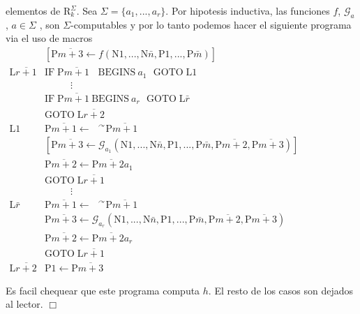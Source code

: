 elementos de \(\mathrm{R}_{k}^{\Sigma }\). Sea \(\Sigma =\{a_{1},...,a_{r}\}.\) Por hipotesis inductiva, las funciones \(f\), \(\mathcal{G}_{a}\), \(a\in \Sigma \) , son \(\Sigma \)-computables y por lo tanto podemos hacer el siguiente programa via el uso de macros
\(\displaystyle \begin{array}{rl} & \left[ \mathrm{P}\overline{m+3}\leftarrow f(\mathrm{N}1,...,\mathrm{N}\bar{ n},\mathrm{P}1,...,\mathrm{P}\bar{m})\right] \\ \mathrm{L}\overline{r+1} & \mathrm{IF}\;\mathrm{P}\overline{m+1}\ \text{ {B}}\mathrm{EGINS\ }a_{1}\text{ }\mathrm{GOTO}\;\mathrm{L}1 \\ & \ \ \ \ \ \ \ \ \ \ \ \ \vdots \\ & \mathrm{IF}\;\mathrm{P}\overline{m+1}\ \mathrm{BEGINS\ }a_{r}\text{ } \mathrm{GOTO}\;\mathrm{L}\bar{r} \\ & \mathrm{GOTO}\;\mathrm{L}\overline{r+2} \\ \mathrm{L}1 & \mathrm{P}\overline{m+1}\leftarrow \text{ }^{\curvearrowright } \mathrm{P}\overline{m+1} \\ & \left[ \mathrm{P}\overline{m+3}\leftarrow \mathcal{G}_{a_{1}}(\mathrm{N} 1,...,\mathrm{N}\bar{n},\mathrm{P}1,...,\mathrm{P}\bar{m},\mathrm{P} \overline{m+2},\mathrm{P}\overline{m+3})\right] \\ & \mathrm{P}\overline{m+2}\leftarrow \mathrm{P}\overline{m+2}a_{1} \\ & \mathrm{GOTO}\;\mathrm{L}\overline{r+1} \\ & \ \ \ \ \ \ \ \ \ \ \ \ \vdots \\ \mathrm{L}\bar{r} & \mathrm{P}\overline{m+1}\leftarrow \text{ } ^{\curvearrowright }\mathrm{P}\overline{m+1} \\ & \mathrm{P}\overline{m+3}\leftarrow \mathcal{G}_{a_{r}}(\mathrm{N}1,..., \mathrm{N}\bar{n},\mathrm{P}1,...,\mathrm{P}\bar{m},\mathrm{P}\overline{m+2}, \mathrm{P}\overline{m+3}) \\ & \mathrm{P}\overline{m+2}\leftarrow \mathrm{P}\overline{m+2}a_{r} \\ & \mathrm{GOTO}\;\mathrm{L}\overline{r+1} \\ \mathrm{L}\overline{r+2} & \mathrm{P}1\leftarrow \mathrm{P}\overline{m+3} \end{array} \)

Es facil chequear que este programa computa \(h.\)
El resto de los casos son dejados al lector. \(\Box\)
